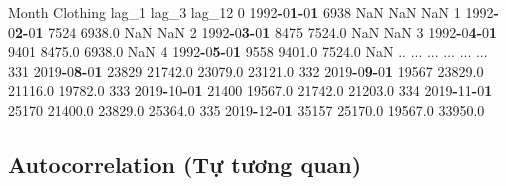 \documentclass[
]{book}
\newenvironment{Shaded}{\begin{snugshade}}{\end{snugshade}}
\newcommand{\DecValTok}[1]{\textcolor[rgb]{0.00,0.00,0.81}{#1}}
\newcommand{\ErrorTok}[1]{\textcolor[rgb]{0.64,0.00,0.00}{\textbf{#1}}}
\newcommand{\FloatTok}[1]{\textcolor[rgb]{0.00,0.00,0.81}{#1}}
\newcommand{\NormalTok}[1]{#1}
\newcommand{\OperatorTok}[1]{\textcolor[rgb]{0.81,0.36,0.00}{\textbf{#1}}}
\begin{document}
\begin{Shaded}
\begin{Highlighting}[]
\NormalTok{         Month  Clothing    lag\_1    lag\_3   lag\_12}
\DecValTok{0}   \DecValTok{1992}\OperatorTok{{-}}\DecValTok{0}\ErrorTok{1}\OperatorTok{{-}}\DecValTok{0}\ErrorTok{1}      \DecValTok{6938}\NormalTok{      NaN      NaN      NaN}
\DecValTok{1}   \DecValTok{1992}\OperatorTok{{-}}\DecValTok{0}\ErrorTok{2}\OperatorTok{{-}}\DecValTok{0}\ErrorTok{1}      \DecValTok{7524}   \FloatTok{6938.0}\NormalTok{      NaN      NaN}
\DecValTok{2}   \DecValTok{1992}\OperatorTok{{-}}\DecValTok{0}\ErrorTok{3}\OperatorTok{{-}}\DecValTok{0}\ErrorTok{1}      \DecValTok{8475}   \FloatTok{7524.0}\NormalTok{      NaN      NaN}
\DecValTok{3}   \DecValTok{1992}\OperatorTok{{-}}\DecValTok{0}\ErrorTok{4}\OperatorTok{{-}}\DecValTok{0}\ErrorTok{1}      \DecValTok{9401}   \FloatTok{8475.0}   \FloatTok{6938.0}\NormalTok{      NaN}
\DecValTok{4}   \DecValTok{1992}\OperatorTok{{-}}\DecValTok{0}\ErrorTok{5}\OperatorTok{{-}}\DecValTok{0}\ErrorTok{1}      \DecValTok{9558}   \FloatTok{9401.0}   \FloatTok{7524.0}\NormalTok{      NaN}
\NormalTok{..         ...       ...      ...      ...      ...}
\DecValTok{331} \DecValTok{2019}\OperatorTok{{-}}\DecValTok{0}\ErrorTok{8}\OperatorTok{{-}}\DecValTok{0}\ErrorTok{1}     \DecValTok{23829}  \FloatTok{21742.0}  \FloatTok{23079.0}  \FloatTok{23121.0}
\DecValTok{332} \DecValTok{2019}\OperatorTok{{-}}\DecValTok{0}\ErrorTok{9}\OperatorTok{{-}}\DecValTok{0}\ErrorTok{1}     \DecValTok{19567}  \FloatTok{23829.0}  \FloatTok{21116.0}  \FloatTok{19782.0}
\DecValTok{333} \DecValTok{2019}\OperatorTok{{-}}\DecValTok{10}\OperatorTok{{-}}\DecValTok{0}\ErrorTok{1}     \DecValTok{21400}  \FloatTok{19567.0}  \FloatTok{21742.0}  \FloatTok{21203.0}
\DecValTok{334} \DecValTok{2019}\OperatorTok{{-}}\DecValTok{11}\OperatorTok{{-}}\DecValTok{0}\ErrorTok{1}     \DecValTok{25170}  \FloatTok{21400.0}  \FloatTok{23829.0}  \FloatTok{25364.0}
\DecValTok{335} \DecValTok{2019}\OperatorTok{{-}}\DecValTok{12}\OperatorTok{{-}}\DecValTok{0}\ErrorTok{1}     \DecValTok{35157}  \FloatTok{25170.0}  \FloatTok{19567.0}  \FloatTok{33950.0}
\end{Highlighting}
\end{Shaded}

\subsection{Autocorrelation (Tự tương quan)}\label{autocorrelation-tux1ef1-tux1b0ux1a1ng-quan}
\end{document}
